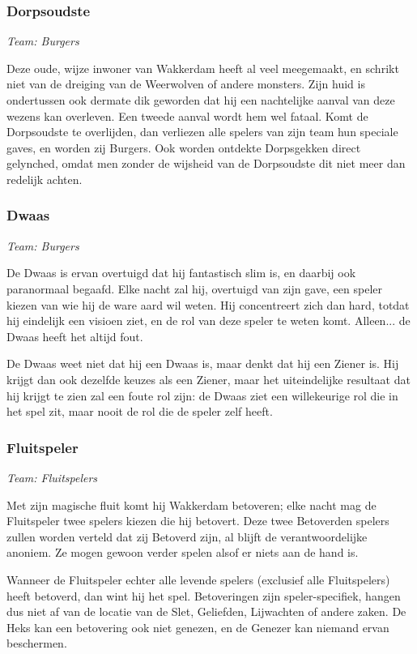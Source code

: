 \documentclass[12pt]{article}
\begin{document}
    \subsubsection{Dorpsoudste}
      \emph{\scriptsize Team: Burgers}
    
      Deze oude, wijze inwoner van Wakkerdam heeft al veel meegemaakt, en schrikt niet van de dreiging van de Weerwolven of andere monsters. Zijn huid is ondertussen ook dermate dik geworden dat hij een nachtelijke aanval van deze wezens kan overleven. Een tweede aanval wordt hem wel fataal. Komt de Dorpsoudste te overlijden, dan verliezen alle spelers van zijn team hun speciale gaves, en worden zij Burgers. Ook worden ontdekte Dorpsgekken direct gelynched, omdat men zonder de wijsheid van de Dorpsoudste dit niet meer dan redelijk achten.
      
    \subsubsection{Dwaas}
      \emph{\scriptsize Team: Burgers}
      
      De Dwaas is ervan overtuigd dat hij fantastisch slim is, en daarbij ook paranormaal begaafd. Elke nacht zal hij, overtuigd van zijn gave, een speler kiezen van wie hij de ware aard wil weten. Hij concentreert zich dan hard, totdat hij eindelijk een visioen ziet, en de rol van deze speler te weten komt. Alleen... de Dwaas heeft het altijd fout.
      
      De Dwaas weet niet dat hij een Dwaas is, maar denkt dat hij een Ziener is. Hij krijgt dan ook dezelfde keuzes als een Ziener, maar het uiteindelijke resultaat dat hij krijgt te zien zal een foute rol zijn: de Dwaas ziet een willekeurige rol die in het spel zit, maar nooit de rol die de speler zelf heeft.

    \subsubsection{Fluitspeler}
      \emph{\scriptsize Team: Fluitspelers}
    
      Met zijn magische fluit komt hij Wakkerdam betoveren; elke nacht mag de Fluitspeler twee spelers kiezen die hij betovert. Deze twee Betoverden spelers zullen worden verteld dat zij Betoverd zijn, al blijft de verantwoordelijke anoniem. Ze mogen gewoon verder spelen alsof er niets aan de hand is.
    
      Wanneer de Fluitspeler echter alle levende spelers (exclusief alle Fluitspelers) heeft betoverd, dan wint hij het spel. Betoveringen zijn speler-specifiek, hangen dus niet af van de locatie van de Slet, Geliefden, Lijwachten of andere zaken. De Heks kan een betovering ook niet genezen, en de Genezer kan niemand ervan beschermen.
    
\end{document}
